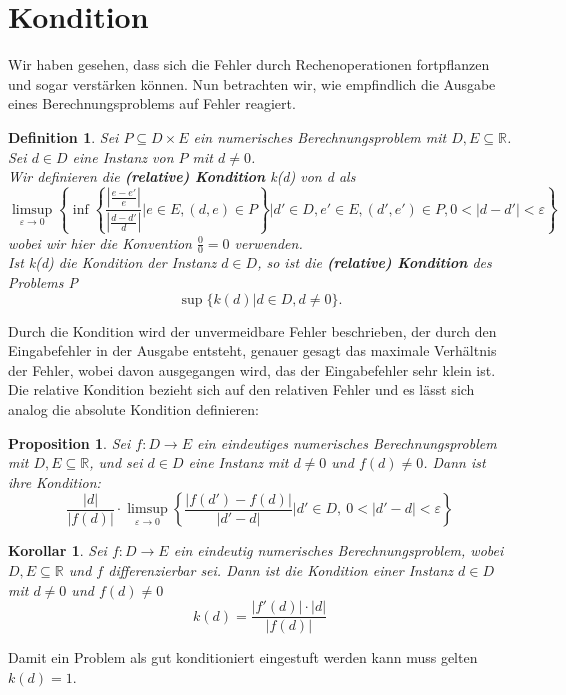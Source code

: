 \documentclass[12pt]{article}
\newcommand{\R}{\mathbb{R}} %
\newtheorem{definition}[satz]{Definition}
\newtheorem{proposition}[satz]{Proposition}
\newtheorem{korollar}[satz]{Korollar}
\begin{document}
\section{Kondition}
Wir haben gesehen, dass sich die Fehler durch Rechenoperationen fortpflanzen und sogar verstärken können. Nun betrachten wir, wie empfindlich die Ausgabe eines Berechnungsproblems auf Fehler reagiert.
\begin{definition}
    Sei $P \subseteq D \times E$ ein numerisches Berechnungsproblem mit $D,E \subseteq \R$. Sei $d \in D$ eine Instanz von $P$ mit $d \neq 0$. \\
    Wir definieren die \textbf{(relative) Kondition} k(d) von d als
    \begin{equation*}
        \limsup_{\varepsilon \to 0} \left\{ \inf \left\{ \frac{|\frac{e-e'}{e}|}{|\frac{d-d'}{d}|}|e \in E, (d,e) \in P \right\} | d'\in D, e'\in E, (d',e') \in P, 0<|d-d'|< \varepsilon \right\}
    \end{equation*}
    wobei wir hier die Konvention $\frac{0}{0}=0$ verwenden. \\
    Ist k(d) die Kondition der Instanz $d \in D$, so ist die \textbf{(relative) Kondition} des Problems P 
    \begin{equation*}
        \sup \{k(d) | d \in D, d \neq 0\}.
    \end{equation*}
\end{definition}

\noindent Durch die Kondition wird der unvermeidbare Fehler beschrieben, der durch den Eingabefehler in der Ausgabe entsteht, genauer gesagt das maximale Verhältnis der Fehler, wobei davon ausgegangen wird, das der Eingabefehler sehr klein ist. \\ 
Die relative Kondition bezieht sich auf den relativen Fehler und es lässt sich analog die absolute Kondition definieren: 

\begin{proposition}
    Sei $f:D \to E$ ein eindeutiges numerisches Berechnungsproblem mit $D,E \subseteq \R$, und sei $d \in D$ eine Instanz mit $d \neq 0$ und $f(d) \neq 0$. Dann ist ihre Kondition: 
    \begin{equation*}
        \frac{|d|}{|f(d)|} \cdot \limsup_{\varepsilon \to 0} \left\{ \frac{|f(d')-f(d)|}{|d'-d|} | d'\in D, \: 0<|d'-d|< \varepsilon \right\}
    \end{equation*}
\end{proposition}

\begin{korollar}
    Sei $f: D \to E$ ein eindeutig numerisches Berechnungsproblem, wobei  $D,E \subseteq \R$ und $f$ differenzierbar sei. Dann ist die Kondition einer Instanz $d \in D$ mit $d \neq 0$ und $f(d) \neq 0$ 
    \begin{equation*}
        k(d) = \frac{|f'(d)| \cdot |d|}{|f(d)|}
    \end{equation*}
\end{korollar}
\vspace{\baselineskip}
\noindent Damit ein Problem als gut konditioniert eingestuft werden kann muss gelten $k(d) = 1$. 
\end{document}
